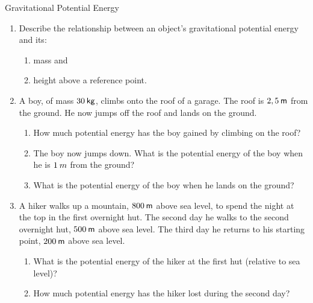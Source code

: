     \noindent
\label{m38784*secfhsst!!!underscore!!!id1025}
\begin{exercises}{Gravitational Potential Energy }
            \nopagebreak
      \label{m38784*id66588}\begin{enumerate}[noitemsep, label=\textbf{\arabic*}. ] 
            \label{m38784*uid50}\item Describe the relationship between an object's gravitational potential energy and its:
\label{m38784*id66604}\begin{enumerate}[noitemsep, label=\textbf{\alph*}. ] 
            \label{m38784*uid51}\item mass and
\label{m38784*uid52}\item height above a reference point.
\end{enumerate}
                \label{m38784*uid53}\item A boy, of mass $30\phantom{\rule{2pt}{0ex}}\mathsf{kg}$, climbs onto the roof of a garage. The roof is $2,5\phantom{\rule{2pt}{0ex}}\mathsf{m}$ from the ground. He now jumps off the roof and lands on the ground.
\label{m38784*id66646}\begin{enumerate}[noitemsep, label=\textbf{\alph*}. ] 
            \label{m38784*uid54}\item How much potential energy has the boy gained by climbing on the roof?
\label{m38784*uid55}\item The boy now jumps down. What is the potential energy of the boy when he is $1\phantom{\rule{2pt}{0ex}}m$ from the ground?
\label{m38784*uid56}\item What is the potential energy of the boy when he lands on the ground?
\end{enumerate}
                \label{m38784*uid57}\item A hiker walks up a mountain, $800\phantom{\rule{2pt}{0ex}}\mathsf{m}$ above sea level, to spend the night at the top in the first overnight hut. The second day he walks to the second overnight hut, $500\phantom{\rule{2pt}{0ex}}\mathsf{m}$ above sea level. The third day he returns to his starting point, $200\phantom{\rule{2pt}{0ex}}\mathsf{m}$ above sea level.
\label{m38784*id66702}\begin{enumerate}[noitemsep, label=\textbf{\alph*}. ] 
            \label{m38784*uid58}\item What is the potential energy of the hiker at the first hut (relative to sea level)?
\label{m38784*uid59}\item How much potential energy has the hiker lost during the second day?

\end{enumerate}
\end{enumerate}
\end{exercises}
